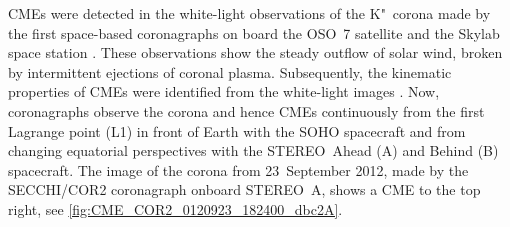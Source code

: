 CMEs were detected in the white-light observations of the K"~corona made by the first space-based coronagraphs on board the OSO~7 satellite \citep{Tousey1973} and the Skylab space station \citep{MacQueen1974}. These observations show the steady outflow of solar wind, broken by intermittent ejections of coronal plasma. Subsequently, the kinematic properties of CMEs were identified from the white-light images \citep{MacQueen1980}. Now, coronagraphs observe the corona and hence CMEs continuously from the first Lagrange point (L1) in front of Earth with the SOHO spacecraft and from changing equatorial perspectives with the STEREO~Ahead (A) and Behind (B) spacecraft. The image of the corona from 23~September 2012, made by the SECCHI/COR2 coronagraph onboard STEREO~A, shows a CME to the top right, see \autoref{fig:CME_COR2_0120923_182400_dbc2A}.
\begin{figure}[htb]
	\begin{floatrow}
\end{floatrow}
\end{figure}
